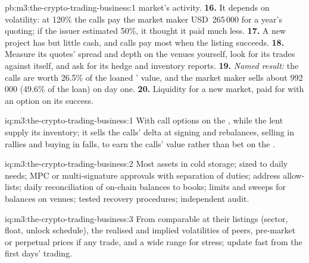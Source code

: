 \begin{solution}{pb:m3:the-crypto-trading-business:1}
market's activity. \textbf{16.} It depends on volatility: at 120\% the calls pay the market maker USD~265\,000 for a year's quoting; if the issuer estimated
50\%, it thought it paid much less. \textbf{17.} A new project has  but little cash, and calls pay most when the listing succeeds. \textbf{18.} Measure
its quotes' spread and depth on the venues yourself, look for its trades against itself, and ask for its hedge and inventory reports. \textbf{19.}
\emph{Named result:} the calls are worth 26.5\% of the loaned ' value, and the market maker sells about 992\,000  (49.6\% of the loan) on day
one. \textbf{20.} Liquidity for a new market, paid for with an option on its success.
\end{solution}

\begin{solution}{iq:m3:the-crypto-trading-business:1}
With call options on the , while the lent  supply its inventory; it sells the calls' delta at signing and rebalances, selling in rallies and buying
in falls, to earn the calls' value rather than bet on the .
\end{solution}

\begin{solution}{iq:m3:the-crypto-trading-business:2}
Most assets in cold storage;  sized to daily needs; MPC or multi-signature approvals with separation of duties; address allow-lists; daily
reconciliation of on-chain balances to books; limits and sweeps for balances on venues; tested recovery procedures; independent audit.
\end{solution}

\begin{solution}{iq:m3:the-crypto-trading-business:3}
From comparable  at their listings (sector, float, unlock schedule), the realised and implied volatilities of peers, pre-market or perpetual prices if
any trade, and a wide range for stress; update fast from the first days' trading.
\end{solution}

